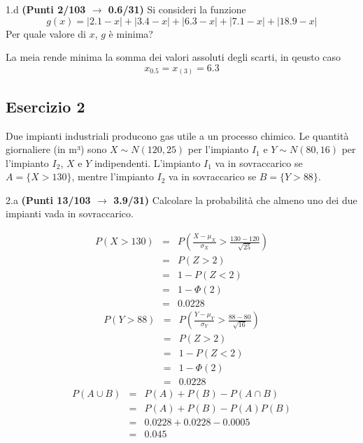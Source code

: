 \documentclass[
  11pt,
]{book}
\theoremstyle{mytheoremstyle}
\theoremstyle{mydefstyle}
\newenvironment{sol}
  {
  \begin{tcolorbox}[enhanced,breakable,arc=0.1mm,boxrule=1pt,colback=white,colframe=iblue,
  title=\bf \fontfamily{lmss}\selectfont \hspace{.5 cm} Soluzione,drop fuzzy shadow]

}{
\end{tcolorbox}
  }
\begin{document}
1.d \textbf{(Punti 2/103 \(\rightarrow\) 0.6/31)} Si consideri la funzione
\[
g(x) = |2.1-x|+|3.4-x|+|6.3-x|+|7.1 -x| + |18.9-x|
\]
Per quale valore di \(x\), \(g\) è minima?

\begin{sol}
La meia rende minima la somma dei valori assoluti degli scarti, in qeusto caso
\[
x_{0.5} = x_{(3)}=6.3
\]

\end{sol}

\subsection{Esercizio 2}\label{esercizio-2-51}

Due impianti industriali producono gas utile a un processo chimico. Le quantità giornaliere (in m³) sono \(X \sim N(120,25)\) per l'impianto \(I_1\) e \(Y \sim N(80,16)\) per l'impianto \(I_2\), \(X\) e \(Y\) indipendenti. L'impianto \(I_1\) va in sovraccarico
se \(A=\{X> 130\}\), mentre l'impianto \(I_2\) va in sovraccarico se \(B=\{Y> 88\}\).

2.a \textbf{(Punti 13/103 \(\rightarrow\) 3.9/31)} Calcolare la probabilità che almeno uno dei due impianti vada in sovraccarico.

\begin{sol}
\begin{eqnarray*}
      P( X   >   130 ) 
        &=& P\left(  \frac { X  -  \mu_X }{ \sigma_X }  >  \frac { 130  -  120 }{\sqrt{ 25 }} \right)  \\
                 &=& P\left(  Z   >   2 \right) \\    &=& 1-P(Z< 2 )\\ 
                 &=&  1-\Phi( 2 ) \\ &=&  0.0228 
      \end{eqnarray*}\begin{eqnarray*}
      P( Y   >   88 ) 
        &=& P\left(  \frac { Y  -  \mu_Y }{ \sigma_Y }  >  \frac { 88  -  80 }{\sqrt{ 16 }} \right)  \\
                 &=& P\left(  Z   >   2 \right) \\    &=& 1-P(Z< 2 )\\ 
                 &=&  1-\Phi( 2 ) \\ &=&  0.0228 
      \end{eqnarray*}
\begin{eqnarray*}
P(A\cup B) &=& P(A)+P(B)-P(A\cap B)\\
 &=& P(A)+P(B)-P(A)P(B)\\
 &=& 0.0228 + 0.0228 -0.0005\\
 &=& 0.045
\end{eqnarray*}

\end{sol}
\end{document}
